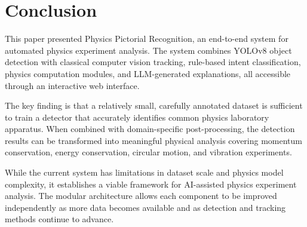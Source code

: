 \documentclass[12pt]{article}
\begin{document}
\section{Conclusion}

This paper presented Physics Pictorial Recognition, an end-to-end system for automated physics experiment analysis. The system combines YOLOv8 object detection with classical computer vision tracking, rule-based intent classification, physics computation modules, and LLM-generated explanations, all accessible through an interactive web interface.

The key finding is that a relatively small, carefully annotated dataset is sufficient to train a detector that accurately identifies common physics laboratory apparatus. When combined with domain-specific post-processing, the detection results can be transformed into meaningful physical analysis covering momentum conservation, energy conservation, circular motion, and vibration experiments.

While the current system has limitations in dataset scale and physics model complexity, it establishes a viable framework for AI-assisted physics experiment analysis. The modular architecture allows each component to be improved independently as more data becomes available and as detection and tracking methods continue to advance.
\end{document}
